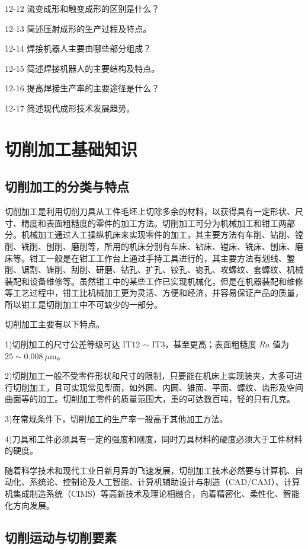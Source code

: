 \documentclass[UTF8]{ctexbook}
\newcommand{\◎}{\ensuremath{\bigcirc}}
\begin{document}
12-12 流变成形和触变成形的区别是什么？

12-13 简述压射成形的生产过程及特点。

12-14 焊接机器人主要由哪些部分组成？

12-15 简述焊接机器人的主要结构及特点。

12-16 提高焊接生产率的主要途径是什么？

12-17 简述现代成形技术发展趋势。

\chapter{切削加工基础知识}

\section{切削加工的分类与特点}

切削加工是利用切削刀具从工件毛坯上切除多余的材料，以获得具有一定形状、尺寸、精度和表面粗糙度的零件的加工方法。切削加工可分为机械加工和钳工两部分。机械加工通过人工操纵机床来实现零件的加工，其主要方法有车削、钻削、镗削、铣削、刨削、磨削等，所用的机床分别有车床、钻床、镗床、铣床、刨床、磨床等。钳工一般是在钳工工作台上通过手持工具进行的，其主要方法有划线、錾削、锯割、锉削、刮削、研磨、钻孔、扩孔、铰孔、锪孔、攻螺纹、套螺纹、机械装配和设备维修等。虽然钳工中的某些工作已实现机械化，但是在机器装配和维修等工艺过程中，钳工比机械加工更为灵活、方便和经济，并容易保证产品的质量，所以钳工是切削加工中不可缺少的一部分。

切削加工主要有以下特点。

1)切削加工的尺寸公差等级可达 IT12 $\sim$ IT3，甚至更高；表面粗糙度 $Ra$ 值为 $25 \sim 0.008~\mu\mathrm{m}$。

2)切削加工一般不受零件形状和尺寸的限制，只要能在机床上实现装夹，大多可进行切削加工，且可实现常见型面，如外圆、内圆、锥面、平面、螺纹、齿形及空间曲面等的加工。切削加工零件的质量范围大，重的可达数百吨，轻的只有几克。

3)在常规条件下，切削加工的生产率一般高于其他加工方法。

4)刀具和工件必须具有一定的强度和刚度，同时刀具材料的硬度必须大于工件材料的硬度。


随着科学技术和现代工业日新月异的飞速发展，切削加工技术必然要与计算机、自动化、系统论、控制论及人工智能、计算机辅助设计与制造（CAD/CAM）、计算机集成制造系统（CIMS）等高新技术及理论相融合，向着精密化、柔性化、智能化方向发展。

\section{切削运动与切削要素}
\end{document}

